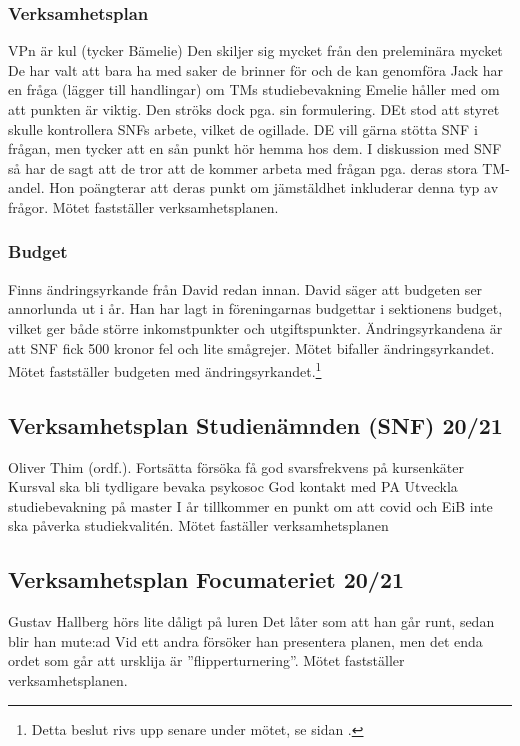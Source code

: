 \documentclass{sektionsmote}
\begin{document}
\subsubsection{Verksamhetsplan}
VPn är kul (tycker Bämelie)
Den skiljer sig mycket från den preleminära mycket
De har valt att bara ha med saker de brinner för och de kan genomföra
Jack har en fråga (lägger till handlingar) om TMs studiebevakning
Emelie håller med om att punkten är viktig. Den ströks dock pga. sin formulering. DEt stod att styret skulle kontrollera SNFs arbete, vilket de ogillade. DE vill gärna stötta SNF i frågan, men tycker att en sån punkt hör hemma hos dem.
I diskussion med SNF så har de sagt att de tror att de kommer arbeta med frågan pga. deras stora TM-andel.
Hon poängterar att deras punkt om jämstäldhet inkluderar denna typ av frågor.
Mötet fastställer verksamhetsplanen.

\subsubsection{Budget}
Finns ändringsyrkande från David redan innan.
David säger att budgeten ser annorlunda ut i år.
Han har lagt in föreningarnas budgettar i sektionens budget, vilket ger både större inkomstpunkter och utgiftspunkter.
Ändringsyrkandena är att SNF fick 500 kronor fel och lite smågrejer.
Mötet bifaller ändringsyrkandet.
Mötet fastställer budgeten med ändringsyrkandet.\footnote{Detta beslut rivs upp senare under mötet, se sidan \pageref{uppriven-budget}.}

\subsection{Verksamhetsplan Studienämnden (SNF) 20/21}
Oliver Thim (ordf.).
Fortsätta försöka få god svarsfrekvens på kursenkäter
Kursval ska bli tydligare
bevaka psykosoc
God kontakt med PA
Utveckla studiebevakning på master
I år tillkommer en punkt om att covid och EiB inte ska påverka studiekvalitén.
Mötet faställer verksamhetsplanen
    
\subsection{Verksamhetsplan Focumateriet 20/21}
Gustav Hallberg hörs lite dåligt på luren
Det låter som att han går runt, sedan blir han mute:ad
Vid ett andra försöker han presentera planen, men det enda ordet som går att ursklija är ''flipperturnering''.
Mötet fastställer verksamhetsplanen.
\end{document}
